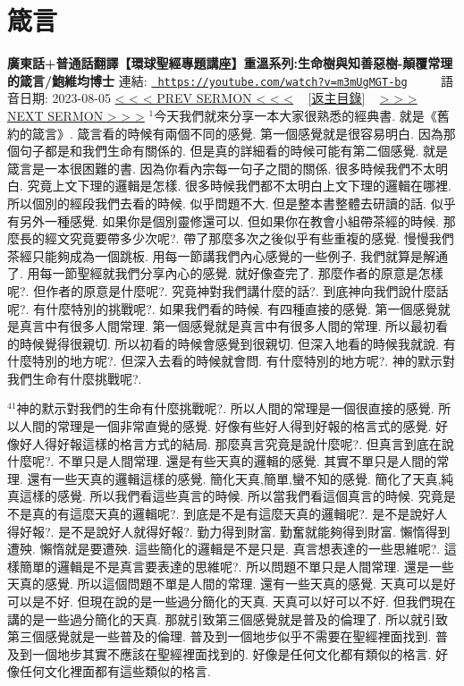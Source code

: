 \documentclass{book}
\begin{document}
\section{箴言}
\label{sec:m3mUgMGT_bg}
\textbf{廣東話+普通話翻譯【環球聖經專題講座】重溫系列:生命樹與知善惡樹-顛覆常理的箴言/鮑維均博士}
\newline
\newline
連結: \href{https://youtube.com/watch?v=m3mUgMGT-bg}{\texttt{ https://youtube.com/watch?v=m3mUgMGT-bg}} ~~~~ 語音日期: 2023-08-05 
\newline
\newline
\hyperref[sec:0YlBYq577gM]{\small{< < < PREV SERMON < < <}}
~
\hyperref[sec:index]{\small{[返主目錄]}}
~
\hyperref[sec:YWND_9pGVGE]{\small{> > > NEXT SERMON > > >}}
\newline
\newline
$^{1}$今天我們就來分享一本大家很熟悉的經典書.
就是《舊約的箴言》.
箴言看的時候有兩個不同的感覺.
第一個感覺就是很容易明白.
因為那個句子都是和我們生命有關係的.
但是真的詳細看的時候可能有第二個感覺.
就是箴言是一本很困難的書.
因為你看內宗每一句子之間的關係.
很多時候我們不太明白.
究竟上文下理的邏輯是怎樣.
很多時候我們都不太明白上文下理的邏輯在哪裡.
所以個別的經段我們去看的時候.
似乎問題不大.
但是整本書整體去研讀的話.
似乎有另外一種感覺.
如果你是個別靈修還可以.
但如果你在教會小組帶茶經的時候.
那麼長的經文究竟要帶多少次呢?.
帶了那麼多次之後似乎有些重複的感覺.
慢慢我們茶經只能夠成為一個跳板.
用每一節講我們內心感覺的一些例子.
我們就算是解通了.
用每一節聖經就我們分享內心的感覺.
就好像查完了.
那麼作者的原意是怎樣呢?.
但作者的原意是什麼呢?.
究竟神對我們講什麼的話?.
到底神向我們說什麼話呢?.
有什麼特別的挑戰呢?.
如果我們看的時候.
有四種直接的感覺.
第一個感覺就是真言中有很多人間常理.
第一個感覺就是真言中有很多人間的常理.
所以最初看的時候覺得很親切.
所以初看的時候會感覺到很親切.
但深入地看的時候我就說.
有什麼特別的地方呢?.
但深入去看的時候就會問.
有什麼特別的地方呢?.
神的默示對我們生命有什麼挑戰呢?.

$^{41}$神的默示對我們的生命有什麼挑戰呢?.
所以人間的常理是一個很直接的感覺.
所以人間的常理是一個非常直覺的感覺.
好像有些好人得到好報的格言式的感覺.
好像好人得好報這樣的格言方式的結局.
那麼真言究竟是說什麼呢?.
但真言到底在說什麼呢?.
不單只是人間常理.
還是有些天真的邏輯的感覺.
其實不單只是人間的常理.
還有一些天真的邏輯這樣的感覺.
簡化天真,簡單,蠻不知的感覺.
簡化了天真,純真這樣的感覺.
所以我們看這些真言的時候.
所以當我們看這個真言的時候.
究竟是不是真的有這麼天真的邏輯呢?.
到底是不是有這麼天真的邏輯呢?.
是不是說好人得好報?.
是不是說好人就得好報?.
勤力得到財富.
勤奮就能夠得到財富.
懶惰得到遭殃.
懶惰就是要遭殃.
這些簡化的邏輯是不是只是.
真言想表達的一些思維呢?.
這樣簡單的邏輯是不是真言要表達的思維呢?.
所以問題不單只是人間常理.
還是一些天真的感覺.
所以這個問題不單是人間的常理.
還有一些天真的感覺.
天真可以是好可以是不好.
但現在說的是一些過分簡化的天真.
天真可以好可以不好.
但我們現在講的是一些過分簡化的天真.
那就引致第三個感覺就是普及的倫理了.
所以就引致第三個感覺就是一些普及的倫理.
普及到一個地步似乎不需要在聖經裡面找到.
普及到一個地步其實不應該在聖經裡面找到的.
好像是任何文化都有類似的格言.
好像任何文化裡面都有這些類似的格言.
\end{document}
